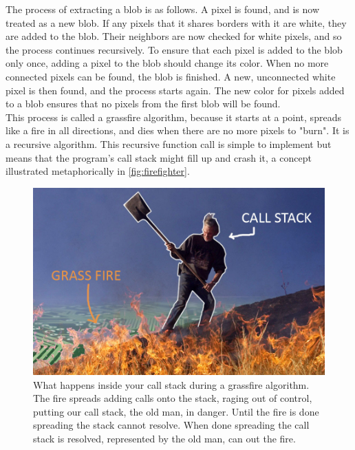 {The process of extracting a blob is as follows. A pixel is found, and is now treated as a new blob. If any pixels that it shares borders with it are white, they are added to the blob. Their neighbors are now checked for white pixels, and so the process continues recursively. To ensure that each pixel is added to the blob only once, adding a pixel to the blob should change its color. When no more connected pixels can be found, the blob is finished. A new, unconnected white pixel is then found, and the process starts again. The new color for pixels added to a blob ensures that no pixels from the first blob will be found.\\
This process is called a grassfire algorithm, because it starts at a point, spreads like a fire in all directions, and dies when there are no more pixels to "burn".
It is a recursive algorithm. This recursive function call is simple to implement but means that the program's call stack might fill up and crash it, a concept illustrated metaphorically in \autoref{fig:firefighter}.  
\begin{figure}[H]
	\centering
	\includegraphics[width=0.6\linewidth]{figure/Analysis/firefighter.jpg}
	\caption{What happens inside your call stack during a grassfire algorithm. The fire spreads adding calls onto the stack, raging out of control, putting our call stack, the old man, in danger. Until the fire is done spreading the stack cannot resolve. When done spreading the call stack is resolved, represented by the old man, can out the fire.}
	\label{fig:firefighter}
\end{figure} 
}
